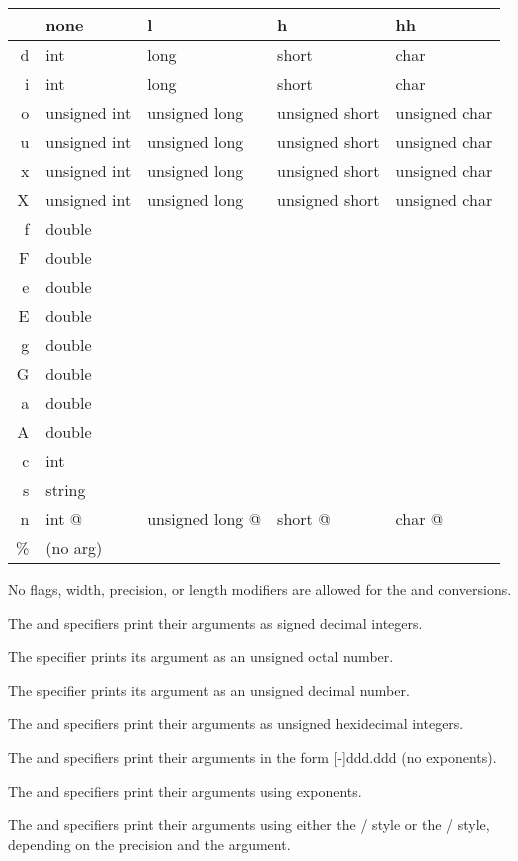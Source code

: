 \begin{tt}
\begin{tabular}{r|llll}
  & none         & l             & h              & hh\\\hline
d & int          & long          & short          & char \\
i & int          & long          & short          & char \\
o & unsigned int & unsigned long & unsigned short & unsigned char \\
u & unsigned int & unsigned long & unsigned short & unsigned char \\
x & unsigned int & unsigned long & unsigned short & unsigned char \\
X & unsigned int & unsigned long & unsigned short & unsigned char \\
f & double \\
F & double \\
e & double \\
E & double \\
g & double \\
G & double \\
a & double \\
A & double \\
c & int \\
s & string \\
n & int @        & unsigned long @ & short @      & char @ \\
\% & \textrm{(no arg)}
\end{tabular}
\end{tt}

No flags, width, precision, or length modifiers are allowed for the
 and \code{\%} conversions.

The  and  specifiers print their arguments as signed
decimal integers.

The  specifier prints its argument as an unsigned octal number.

The  specifier prints its argument as an unsigned decimal number.

The  and  specifiers print their arguments as unsigned
hexidecimal integers.

The  and  specifiers print their arguments in the form
[-]ddd.ddd (no exponents).

The  and  specifiers print their arguments using exponents.

The  and  specifiers print their arguments using either
the /
style or the / style, depending on the precision and the
argument.

